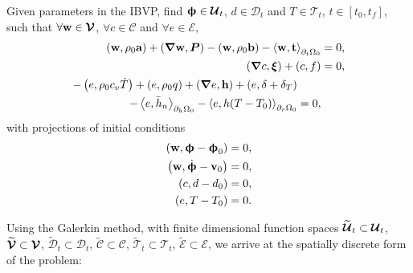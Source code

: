 \begin{mdframed}[
    frametitle={The weak form},
    frametitlebackgroundcolor=gray!20,
    backgroundcolor=gray!5,
    linewidth=0pt,
    nobreak=true
  ]
  Given parameters in the IBVP, find $\boldsymbol{\upphi} \in \boldsymbol{\mathcal{U}}_t$, $d \in \mathcal{D}_t$ and $T \in \mathcal{T}_t$, $t \in [t_0, t_f]$, such that $\forall \textbf{w} \in \boldsymbol{\mathcal{V}}$, $\forall c \in \mathcal{C}$ and $\forall e \in \mathcal{E}$,
  \begin{subequations}
    \begin{align}
      \left( \textbf{w}, \rho_0\textbf{a} \right) + \left( \boldsymbol{\nabla} \textbf{w}, \boldsymbol{P} \right) - \left( \textbf{w}, \rho_0 \textbf{b} \right) - \left< \textbf{w}, \textbf{t} \right>_{\partial_t\Omega_0} &= 0,    \\
      \left( \boldsymbol{\nabla} c, \boldsymbol{\xi} \right) + \left( c, f \right) &= 0, \\
      \begin{split}
        - \left( e, \rho_0c_v\dot{T} \right) + \left( e, \rho_0q \right) + \left( \boldsymbol{\nabla} e, \textbf{h} \right) + \left( e, \delta+\delta_T \right)& \\
        - \left< e, \bar{h}_n \right>_{\partial_h\Omega_0} - \left< e, h(T-T_0) \right>_{\partial_r\Omega_0} &= 0,
      \end{split} 
    \end{align}
  \end{subequations}
  with projections of initial conditions
  \begin{subequations}
  \begin{align}
      \left( \textbf{w}, \boldsymbol{\upphi} - \boldsymbol{\upphi}_0 \right) &= 0, \\
      \left( \textbf{w}, \dot{\boldsymbol{\upphi}} - \textbf{v}_0 \right) &= 0, \\
      \left( c, d - d_0 \right) &= 0, \\
      \left( e, T - T_0 \right) &= 0.
  \end{align}
  \end{subequations}
\end{mdframed}
Using the Galerkin method, with finite dimensional function spaces $\widetilde{\boldsymbol{\mathcal{U}}}_t \subset \boldsymbol{\mathcal{U}}_t$, $\widetilde{\boldsymbol{\mathcal{V}}} \subset \boldsymbol{\mathcal{V}}$, $\widetilde{\mathcal{D}}_t \subset \mathcal{D}_t$, $\widetilde{\mathcal{C}} \subset \mathcal{C}$, $\widetilde{\mathcal{T}}_t \subset \mathcal{T}_t$, $\widetilde{\mathcal{E}} \subset \mathcal{E}$, we arrive at the spatially discrete form of the problem:
